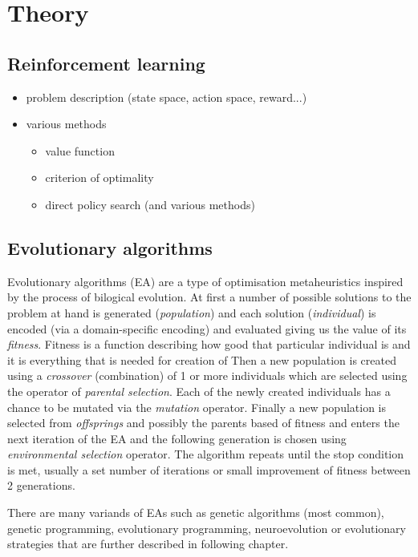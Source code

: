 \chapter{Theory}
\label{chap:theory}

\section{Reinforcement learning}
\label{sec:reinf}
\begin{itemize}
    \item problem description (state space, action space, reward...)
    \item various methods \begin{itemize}
        \item value function
        \item criterion of optimality
        \item direct policy search (and various methods)
    \end{itemize}
\end{itemize}
\section{Evolutionary algorithms}
\label{sec:ea}
Evolutionary algorithms (EA) are a type of optimisation metaheuristics inspired by the process of bilogical evolution. At first a number of possible solutions to the problem at hand is generated (\emph{population}) and each solution (\emph{individual}) is encoded (via a domain-specific encoding) and evaluated giving us the value of its \emph{fitness}. Fitness is a function describing how good that particular individual is and it is everything that is needed for creation of  Then a new population is created using a \emph{crossover} (combination) of 1 or more individuals which are selected using the operator of \emph{parental selection}. Each of the newly created individuals has a chance to be mutated via the \emph{mutation} operator. Finally a new population is selected from \emph{offsprings} and possibly the parents based of fitness and enters the next iteration of the EA and the following generation is chosen using \emph{environmental selection} operator. The algorithm repeats until the stop condition is met, usually a set number of iterations or small improvement of fitness between 2 generations. 

There are many variands of EAs such as genetic algorithms (most common), genetic programming, evolutionary programming, neuroevolution or evolutionary strategies that are further described in following chapter. \cite{Rudolph2012} \cite{Vikhar2016}

